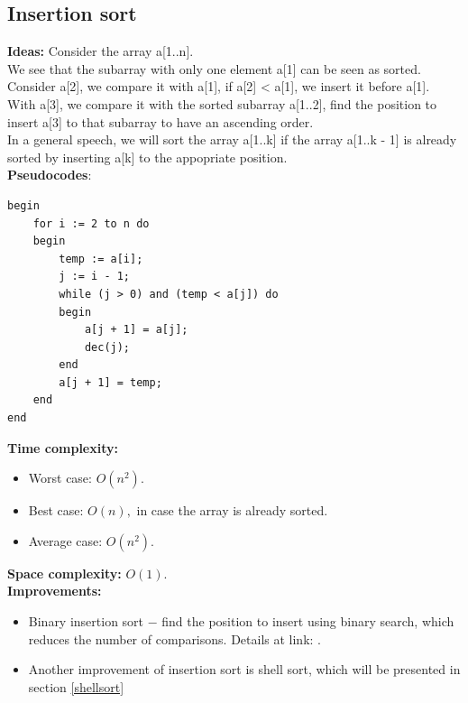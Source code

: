 \documentclass[12pt,a4paper]{article}
\begin{document}
\subsection{Insertion sort}
\textbf{Ideas:} Consider the array a[1..n].\\
We see that the subarray with only one element a[1] can be seen as sorted.\\
Consider a[2], we compare it with a[1], if a[2] < a[1], we insert it before a[1].\\
With a[3], we compare it with the sorted subarray a[1..2], find the position to insert a[3] to that subarray to have an ascending order.\\
In a general speech, we will sort the array a[1..k] if the array a[1..k - 1] is already sorted by inserting a[k] to the appopriate position.\\
\textbf{Pseudocodes}: \cite{gtvlt}
\lstset{language=Pascal} 
\begin{lstlisting}[caption = {Insertion sort}]
begin
	for i := 2 to n do
	begin
		temp := a[i];
		j := i - 1;
		while (j > 0) and (temp < a[j]) do
		begin
			a[j + 1] = a[j];
			dec(j);
		end
		a[j + 1] = temp;
	end
end
\end{lstlisting}
\textbf{Time complexity: } \cite{comp}
\begin{itemize}
\item Worst case: $O \left( {n^2} \right).$
\item Best case: $O \left( {n} \right),$ in case the array is already sorted.
\item Average case: $O \left( {n^2} \right).$
\end{itemize}
\textbf{Space complexity:} $O \left( {1} \right).$ \cite{comp}\\
\textbf{Improvements:}
\begin{itemize}
\item Binary insertion sort $-$ find the position to insert using binary search, which reduces the number of comparisons. Details at link: \cite{bininsert}.
\item Another improvement of insertion sort is shell sort, which will be presented in section \ref{shellsort}
\end{itemize}
\end{document}
